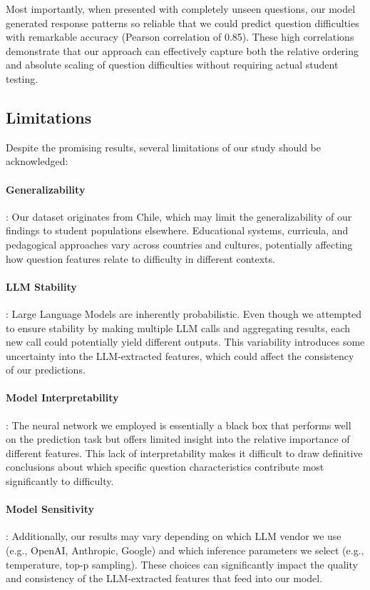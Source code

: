 \documentclass[
    a4paper, %
    10pt, %
    twoside, %
]{LTJournalArticle}
\begin{document}
Most importantly, when presented with completely unseen questions, our model generated response patterns so reliable that we could predict question difficulties with remarkable accuracy (Pearson correlation of 0.85). These high correlations demonstrate that our approach can effectively capture both the relative ordering and absolute scaling of question difficulties without requiring actual student testing.

\subsection{Limitations}

Despite the promising results, several limitations of our study should be acknowledged:

\paragraph{Generalizability}: Our dataset originates from Chile, which may limit the generalizability of our findings to student populations elsewhere. Educational systems, curricula, and pedagogical approaches vary across countries and cultures, potentially affecting how question features relate to difficulty in different contexts.
    
\paragraph{LLM Stability}: Large Language Models are inherently probabilistic. Even though we attempted to ensure stability by making multiple LLM calls and aggregating results, each new call could potentially yield different outputs. This variability introduces some uncertainty into the LLM-extracted features, which could affect the consistency of our predictions.
    
\paragraph{Model Interpretability}: The neural network we employed is essentially a black box that performs well on the prediction task but offers limited insight into the relative importance of different features. This lack of interpretability makes it difficult to draw definitive conclusions about which specific question characteristics contribute most significantly to difficulty.
    
\paragraph{Model Sensitivity}: Additionally, our results may vary depending on which LLM vendor we use (e.g., OpenAI, Anthropic, Google) and which inference parameters we select (e.g., temperature, top-p sampling). These choices can significantly impact the quality and consistency of the LLM-extracted features that feed into our model.
    
\end{document}

